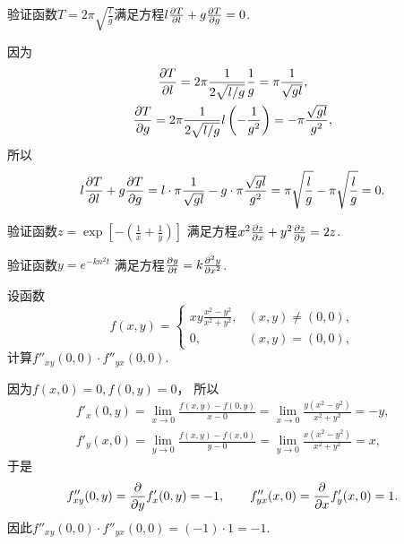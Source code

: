 \begin{example}
验证函数\(T = 2\pi\sqrt{\frac{l}{g}}\)满足方程\(l\pdv{T}{l}+g\pdv{T}{g}=0\).
\begin{solution}
因为\begin{gather*}
	\pdv{T}{l} = 2\pi \frac{1}{2\sqrt{l/g}} \frac{1}{g}
	= \pi \frac{1}{\sqrt{gl}}, \\
	\pdv{T}{g} = 2\pi \frac{1}{2\sqrt{l/g}} l \left(-\frac{1}{g^2}\right)
	= -\pi \frac{\sqrt{gl}}{g^2},
\end{gather*}
所以\[
	l \pdv{T}{l} + g \pdv{T}{g}
	= l \cdot \pi \frac{1}{\sqrt{gl}} - g \cdot \pi \frac{\sqrt{gl}}{g^2}
	= \pi \sqrt{\frac{l}{g}} - \pi \sqrt{\frac{l}{g}} = 0.
\]
\end{solution}
\end{example}

\begin{example}
验证函数\(z = \exp[-\left(\frac{1}{x}+\frac{1}{y}\right)]\)
满足方程\(x^2 \pdv{z}{x} + y^2 \pdv{z}{y} = 2z\).
\end{example}

\begin{example}
验证函数\(y = e^{-k n^2 t}\)
满足方程\(\pdv{y}{t} = k \pdv[2]{y}{x}\).
\end{example}

\begin{example}
设函数\[
	f(x,y) = \left\{ \begin{array}{cl}
		x y \frac{x^2 - y^2}{x^2 + y^2}, & (x,y)\neq(0,0), \\
		0, & (x,y)=(0,0),
	\end{array} \right.
\]
计算\(f''_{xy}(0,0) \cdot f''_{yx}(0,0)\).
\begin{solution}
因为\(f(x,0) = 0,
f(0,y) = 0\)，
所以\begin{gather*}
	f'_x(0,y) = \lim_{x\to0} \frac{f(x,y) - f(0,y)}{x - 0}
	= \lim_{x\to0} \frac{y (x^2 - y^2)}{x^2 + y^2}
	= -y, \\
	f'_y(x,0) = \lim_{y\to0} \frac{f(x,y) - f(x,0)}{y - 0}
	= \lim_{y\to0} \frac{x (x^2 - y^2)}{x^2 + y^2}
	= x,
\end{gather*}
于是\[
	f''_{xy}(0,y) = \pdv{y} f'_x(0,y) = -1,
	\qquad
	f''_{yx}(x,0) = \pdv{x} f'_y(x,0) = 1.
\]
因此\(f''_{xy}(0,0) \cdot f''_{yx}(0,0) = (-1)\cdot1 = -1\).
\end{solution}
\end{example}

